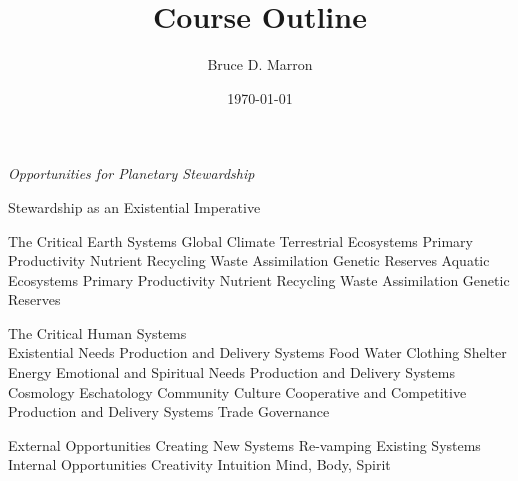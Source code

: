\documentclass[12pt, letterpaper]{article}
\title{\vspace{-15mm}\fontsize{14pt}{10pt}
                    \selectfont \textbf{Course Outline}   %
                    \vspace{-7mm}
      }
\author{
     \normalsize Bruce D. Marron \\                     %
     \vspace{-5mm}
}
\date{\normalsize \today}
\begin{document}
\begin{singlespacing}
\end{singlespacing}
\thispagestyle{fancy}                           %



\large
\begin{flushleft}
\textit{Opportunities for Planetary Stewardship}
\end{flushleft}

\normalsize

\begin{outline}[enumerate]
\1 Stewardship as an Existential Imperative

\1 The Critical Earth Systems
\2 Global Climate
\2 Terrestrial Ecosystems
\3 Primary Productivity
\3 Nutrient Recycling
\3 Waste Assimilation
\3 Genetic Reserves
\2 Aquatic Ecosystems
\3 Primary Productivity
\3 Nutrient Recycling
\3 Waste Assimilation
\3 Genetic Reserves

\1 The Critical Human Systems\\
\textit{\cite{max-neef_development_2010}}
\2 Existential Needs Production and Delivery Systems
\3 Food
\3 Water
\3 Clothing
\3 Shelter
\3 Energy
\2 Emotional and Spiritual Needs Production and Delivery Systems
\3 Cosmology
\3 Eschatology
\3 Community
\3 Culture
\2 Cooperative and Competitive Production and Delivery Systems
\3 Trade
\3 Governance

\1 External Opportunities
\2 Creating New Systems
\2 Re-vamping Existing Systems
\
\1 Internal Opportunities
\2 Creativity
\2 Intuition
\2 Mind, Body, Spirit
\end{outline}





\clearpage 
\renewcommand{\thepage}{}
\printbibliography
\end{document}
